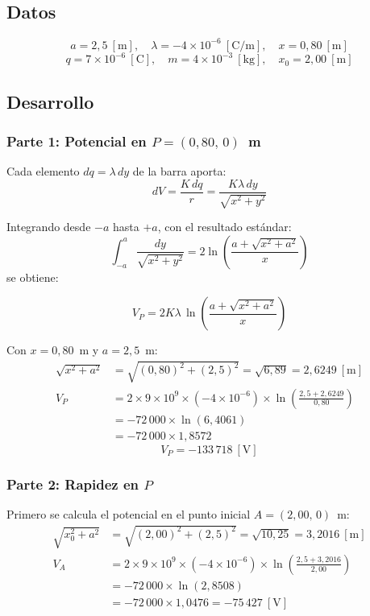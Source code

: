 \documentclass[12pt,letterpaper]{article}
\begin{document}
\subsection*{Datos}

\[
    a = 2{,}5\ [\text{m}],\quad \lambda = -4\times10^{-6}\ [\text{C/m}],\quad x = 0{,}80\ [\text{m}]
\]
\[
    q = 7\times10^{-6}\ [\text{C}],\quad m = 4\times10^{-3}\ [\text{kg}],\quad x_0 = 2{,}00\ [\text{m}]
\]

\subsection*{Desarrollo}

\subsubsection*{Parte 1: Potencial en $P = (0{,}80,\,0)$~m}

Cada elemento $dq = \lambda\,dy$ de la barra aporta:
\[
    dV = \frac{K\,dq}{r} = \frac{K\lambda\,dy}{\sqrt{x^2+y^2}}
\]

Integrando desde $-a$ hasta $+a$, con el resultado est\'andar:
\[
    \int_{-a}^{a}\frac{dy}{\sqrt{x^2+y^2}}
    = 2\ln\!\left(\frac{a+\sqrt{x^2+a^2}}{x}\right)
\]
se obtiene:

\[
    V_P = 2K\lambda\,\ln\!\left(\frac{a + \sqrt{x^2+a^2}}{x}\right)
\]

Con $x = 0{,}80$~m y $a = 2{,}5$~m:
\begin{align*}
    \sqrt{x^2+a^2} &= \sqrt{(0{,}80)^2+(2{,}5)^2} = \sqrt{6{,}89} = 2{,}6249\ [\text{m}] \\[6pt]
    V_P &= 2 \times 9\times10^9 \times (-4\times10^{-6})
            \times \ln\!\left(\frac{2{,}5+2{,}6249}{0{,}80}\right) \\[4pt]
        &= -72\,000 \times \ln(6{,}4061) \\[4pt]
        &= -72\,000 \times 1{,}8572
\end{align*}
\[
    \boxed{V_P = -133\,718\ [\text{V}]}
\]

\subsubsection*{Parte 2: Rapidez en $P$}

Primero se calcula el potencial en el punto inicial $A = (2{,}00,\,0)$~m:
\begin{align*}
    \sqrt{x_0^2+a^2} &= \sqrt{(2{,}00)^2+(2{,}5)^2} = \sqrt{10{,}25} = 3{,}2016\ [\text{m}] \\[6pt]
    V_A &= 2 \times 9\times10^9 \times (-4\times10^{-6})
           \times \ln\!\left(\frac{2{,}5+3{,}2016}{2{,}00}\right) \\[4pt]
        &= -72\,000 \times \ln(2{,}8508) \\[4pt]
        &= -72\,000 \times 1{,}0476 = -75\,427\ [\text{V}]
\end{align*}
\end{document}
